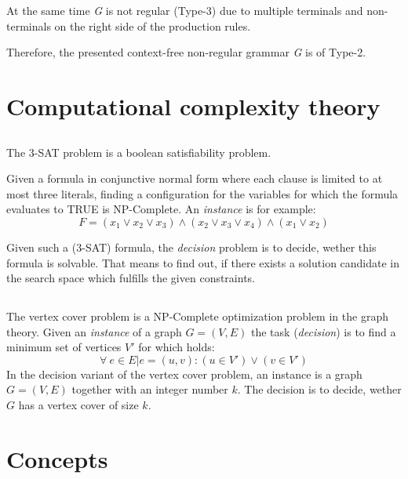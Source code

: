 \documentclass[11pt]{article}
\begin{document}
At the same time \emph{G} is not regular (Type-3) due to multiple terminals and non-terminals on the right side of the production rules.

Therefore, the presented context-free non-regular grammar \emph{G} is of Type-2.

\section{Computational complexity theory}
\subsection{}
The 3-SAT problem is a boolean satisfiability problem. 

Given a formula in conjunctive normal form where each clause is limited to at most three literals, finding a configuration for the variables for which the formula evaluates to TRUE is NP-Complete. An \emph{instance} is for example:
\begin{equation*}
	F=(x_1 \lor x_2\lor x_3)\land(x_2\lor x_3 \lor x_4)\land(x_1 \lor x_2)
\end{equation*}

Given such a (3-SAT) formula, the \emph{decision} problem is to decide, wether this formula is solvable. That means to find out, if there exists a solution candidate in the search space which fulfills the given constraints.

\subsection{}
The vertex cover problem is a NP-Complete optimization problem in the graph theory. Given an \emph{instance} of a graph  $G=(V,E)$ the task (\emph{decision}) is to find a minimum set of vertices $V'$ for which holds:
\begin{equation*}
	\forall \: e \in E| e=(u,v):(u\in V')\lor (v \in V')
\end{equation*}
In the decision variant of the vertex cover problem, an instance is a graph $G=(V,E)$ together with an integer number $k$. The decision is to decide, wether $G$ has a vertex cover of size $k$. 
\subsection{}


\section{Concepts}
\end{document}
